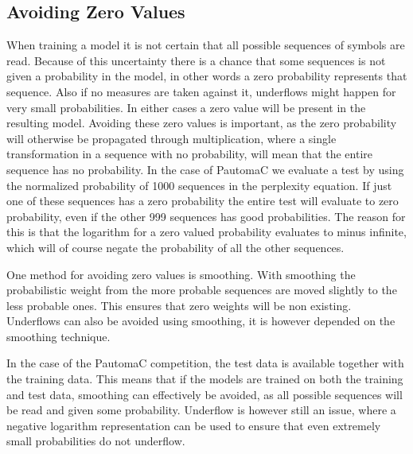 \subsection{Avoiding Zero Values}

When training a model it is not certain that all possible sequences of symbols are read. Because of this uncertainty there is a chance that some sequences is not given a probability in the model, in other words a zero probability represents that sequence. Also if no measures are taken against it, underflows might happen for very small probabilities. In either cases a zero value will be present in the resulting model. Avoiding these zero values is important, as the zero probability will otherwise be propagated through multiplication, where a single transformation in a sequence with no probability, will mean that the entire sequence has no probability. In the case of PautomaC we evaluate a test by using the normalized probability of 1000 sequences in the perplexity equation. If just one of these sequences has a zero probability the entire test will evaluate to zero probability, even if the other 999 sequences has good probabilities. The reason for this is that the logarithm for a zero valued probability evaluates to minus infinite, which will of course negate the probability of all the other sequences.


One method for avoiding zero values is smoothing. With smoothing the probabilistic weight from the more probable sequences are moved slightly to the less probable ones. This ensures that zero weights will be non existing. Underflows can also be avoided using smoothing, it is however depended on the smoothing technique.


In the case of the PautomaC competition, the test data is available together with the training data. This means that if the models are trained on both the training and test data, smoothing can effectively be avoided, as all possible sequences will be read and given some probability. Underflow is however still an issue, where a negative logarithm representation can be used to ensure that even extremely small probabilities do not underflow.